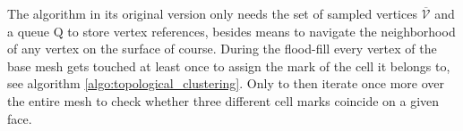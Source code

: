 The algorithm in its original version only needs the set of sampled vertices $\overline{\mathcal{V}}$ and a queue $\mathrm{Q}$ to store vertex references, besides means to navigate the neighborhood of any vertex on the surface of course.
During the flood-fill every vertex of the base mesh gets touched at least once to assign the mark of the cell it belongs to, see algorithm \ref{algo:topological_clustering}.
Only to then iterate once more over the entire mesh to check whether three different cell marks coincide on a given face.
\begin{table}[htb] \medskip \centering
\setlength{\tabcolsep}{5pt}
\renewcommand{\arraystretch}{1.10}
\end{table}
